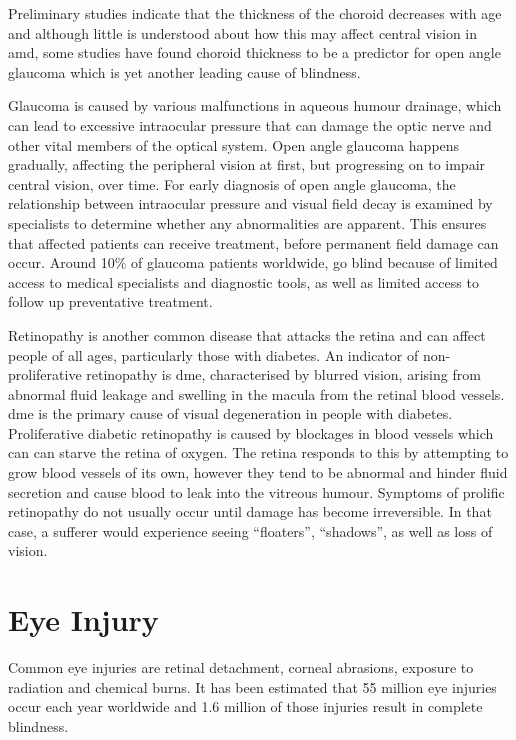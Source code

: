 Preliminary studies indicate that the thickness of the choroid
decreases with age and although little is understood about how
this may affect central vision in \acrshort{amd}, some studies
have found choroid thickness to be a predictor for open angle
glaucoma which is yet another leading cause of
blindness.\cite{margolis2009pilot,gordon2002ocular}

Glaucoma is caused by various malfunctions in aqueous
humour drainage, which can lead to excessive intraocular pressure
that can damage the optic nerve and other vital members of the
optical system.\cite{distelhorst2003open} Open angle glaucoma
happens gradually, affecting the peripheral vision at first, but
progressing on to impair central vision, over time. For early diagnosis
of open angle glaucoma, the relationship between intraocular pressure
and visual field decay is examined by specialists to determine whether
any abnormalities are apparent. This ensures that affected patients
can receive treatment, before permanent field damage can occur.
\cite{goldmann1972open} Around 10\% of glaucoma patients worldwide,
go blind because of limited access to medical specialists and diagnostic
tools, as well as limited access to follow up preventative treatment.
\cite{west2000looking}

Retinopathy is another common disease that attacks the retina and
can affect people of all ages, particularly those with diabetes.\cite{klein1984wisconsin} An
indicator of non-proliferative retinopathy is \Gls{dme},
characterised by blurred vision, arising from abnormal fluid leakage
and swelling in the macula from the retinal blood vessels.
\cite{hee1995quantitative} \gls{dme} is the primary cause of
visual degeneration in people with diabetes.\cite{klein1984wisconsin}
Proliferative diabetic retinopathy is caused by blockages in blood vessels
which can can starve the retina of oxygen. The retina responds to this by
attempting to grow blood vessels of its own, however they tend to be
abnormal and hinder fluid secretion and cause blood to leak into the
vitreous humour. Symptoms of prolific retinopathy do not usually occur
until damage has become irreversible. In that case, a sufferer would
experience seeing \enquote{floaters}, \enquote{shadows}, as well as
loss of vision.

\section{Eye Injury}

Common eye injuries are retinal detachment, corneal abrasions, exposure to
radiation and chemical burns. It has been estimated that 55 million eye injuries
occur each year worldwide and 1.6 million of those injuries result in complete
blindness.\cite{negrel1998global}

